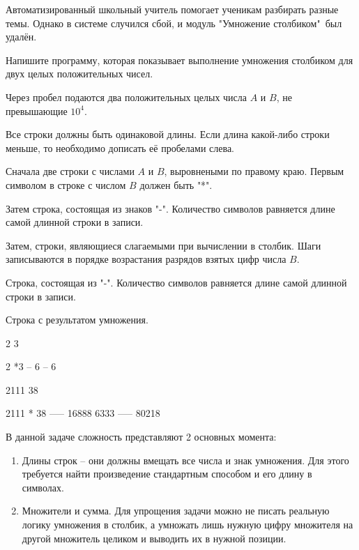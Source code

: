 
Автоматизированный школьный учитель помогает ученикам разбирать разные темы. Однако в системе случился сбой, и модуль "Умножение столбиком"\ был удалён.

Напишите программу, которая показывает выполнение умножения столбиком для двух целых положительных чисел.


Через пробел подаются два положительных целых числа $A$ и $B$, не превышающие $10^4$.

\outputfmtSection

Все строки должны быть одинаковой длины. Если длина какой-либо строки меньше, то необходимо дописать её пробелами слева.

Сначала две строки с числами $A$ и $B$, выровнеными по правому краю. Первым символом в строке с числом $B$ должен быть "*".

Затем строка, состоящая из знаков "-". Количество символов равняется длине самой длинной строки в записи.

Затем, строки, являющиеся слагаемыми при вычислении в столбик. Шаги записываются в порядке возрастания разрядов взятых цифр числа $B$.

Строка, состоящая из "-". Количество символов равняется длине самой длинной строки в записи.

Строка с результатом умножения.


\begin{myverbbox}[\small]{\vinput}
    2 3
\end{myverbbox}
\begin{myverbbox}[\small]{\voutput}
     2
    *3
    --
     6
    --
     6
\end{myverbbox}


\begin{myverbbox}[\small]{\vinput}
    2111 38
\end{myverbbox}
\begin{myverbbox}[\small]{\voutput}
     2111
    *  38
    -----
    16888
    6333 
    -----
    80218
\end{myverbbox}

\solutionSection

В данной задаче сложность представляют 2 основных момента:
\begin{enumerate}
    \item Длины строк – они должны вмещать все числа и знак умножения. Для этого требуется найти произведение стандартным способом и его длину в символах.
    \item Множители и сумма. Для упрощения задачи можно не писать реальную логику умножения в столбик, а умножать лишь нужную цифру множителя на другой множитель целиком и выводить их в нужной позиции.
\end{enumerate}

